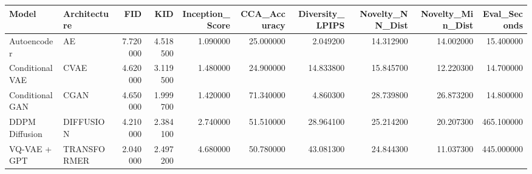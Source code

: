 \begin{tabular}{llrrrrrrrr}
\toprule
Model & Architecture & FID & KID & Inception_Score & CCA_Accuracy & Diversity_LPIPS & Novelty_NN_Dist & Novelty_Min_Dist & Eval_Seconds \\
\midrule
Autoencoder & AE & 7.720000 & 4.518500 & 1.090000 & 25.000000 & 2.049200 & 14.312900 & 14.002000 & 15.400000 \\
Conditional VAE & CVAE & 4.620000 & 3.119500 & 1.480000 & 24.900000 & 14.833800 & 15.845700 & 12.220300 & 14.700000 \\
Conditional GAN & CGAN & 4.650000 & 1.999700 & 1.420000 & 71.340000 & 4.860300 & 28.739800 & 26.873200 & 14.800000 \\
DDPM Diffusion & DIFFUSION & 4.210000 & 2.384100 & 2.740000 & 51.510000 & 28.964100 & 25.214200 & 20.207300 & 465.100000 \\
VQ-VAE + GPT & TRANSFORMER & 2.040000 & 2.497200 & 4.680000 & 50.780000 & 43.081300 & 24.844300 & 11.037300 & 445.000000 \\
\bottomrule
\end{tabular}
